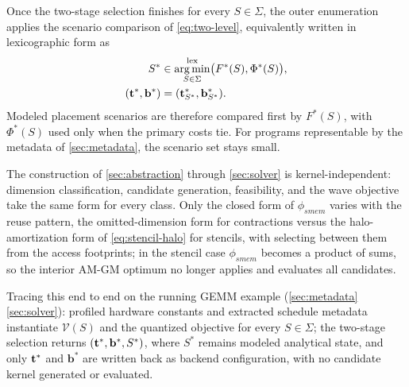 Once the two-stage selection finishes for every \(S\in\Sigma\), the outer enumeration applies the scenario comparison of \autoref{eq:two-level}, equivalently written in lexicographic form as
\begin{equation}
\begin{aligned}
S^*
&\in \mathop{\arg\min}_{S\in\Sigma}^{\mathrm{lex}}
   \bigl(F^*(S),\Phi^*(S)\bigr),\\
(\mathbf{t}^*,\mathbf{b}^*)
&=(\mathbf{t}_{S^*}^*,\mathbf{b}_{S^*}^*).
\end{aligned}
\label{eq:outer-selection}
\end{equation}
Modeled placement scenarios are therefore compared first by \(F^*(S)\), with \(\Phi^*(S)\) used only when the primary costs tie. For programs representable by the metadata of \autoref{sec:metadata}, the scenario set stays small.

The construction of \autoref{sec:abstraction} through \autoref{sec:solver} is kernel-independent: dimension classification, candidate generation, feasibility, and the wave objective take the same form for every class. Only the closed form of \(\phi_{\mathit{smem}}\) varies with the reuse pattern, the omitted-dimension form for contractions versus the halo-amortization form of \autoref{eq:stencil-halo} for stencils, with \name selecting between them from the access footprints; in the stencil case \(\phi_{\mathit{smem}}\) becomes a product of sums, so the interior AM-GM optimum no longer applies and \name evaluates all candidates.

Tracing this end to end on the running GEMM example (\autoref{sec:metadata}\textendash\autoref{sec:solver}): profiled hardware constants and extracted schedule metadata instantiate \(\mathcal{V}(S)\) and the quantized objective for every \(S\in\Sigma\); the two-stage selection returns \((\mathbf{t}^*,\mathbf{b}^*,S^*)\), where \(S^*\) remains modeled analytical state, and only \(\mathbf{t}^*\) and \(\mathbf{b}^*\) are written back as backend configuration, with no candidate kernel generated or evaluated.
